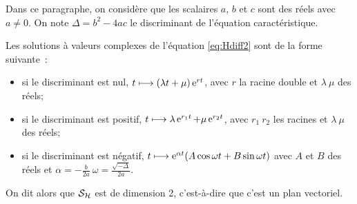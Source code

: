 Dans ce paragraphe, on considère que les scalaires \(a\), \(b\) et \(c\) sont 
des réels avec \(a \neq 0\). On note \(\Delta = b^2-4ac\) le discriminant de 
l'équation caractéristique.
\begin{theo}
    \label{theo:6}
    Les solutions à valeurs complexes de l'équation \eqref{eq:Hdiff2} sont de la 
    forme suivante~:
    \begin{itemize}
        \item si le discriminant est nul, \(t \longmapsto (\lambda t + 
            \mu)\operatorname{e}^{rt}\), avec \(r\) la racine double et \(\lambda \ \mu\) des 
            réels;
        \item si le discriminant est positif, \(t \longmapsto \lambda \operatorname{e}^{r_1 t} 
            + \mu \operatorname{e}^{r_2 t}\), avec \(r_1 \ r_2\) les racines et \(\lambda \ 
            \mu\) des réels;
        \item si le discriminant est négatif, \(t \longmapsto \operatorname{e}^{\alpha t} (A 
            \cos \omega t + B \sin \omega t)\) avec \(A\) et \(B\) des réels et 
            \(\alpha = -\frac{b}{2a} \ \omega = \frac{\sqrt{-\Delta}}{2a}\).
  \end{itemize}
  On dit alors que \(\mathcal{S}_{\mathcal{H}}\) est de dimension 2, c'est-à-dire que c'est un plan vectoriel.
\end{theo}

